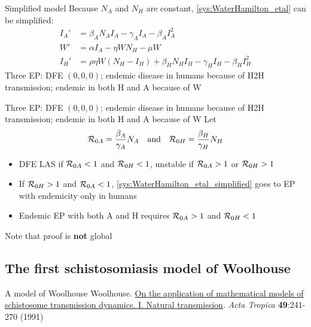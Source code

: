 \documentclass[aspectratio=169]{beamer}
\begin{document}
\begin{frame}{Simplified model}
  Because $N_A$ and $N_H$ are constant, \eqref{sys:WaterHamilton_etal} can be simplified:
  \begin{subequations}
    \label{sys:WaterHamilton_etal_simplified}
    \begin{align}
      I_A' &= \beta_AN_AI_A-\gamma_AI_A-\beta_AI_A^2 \\
      W' &= \alpha I_A-\eta WN_H-\mu W \\
      I_H' &= \rho\eta W(N_H-I_H)+\beta_HN_HI_H-\gamma_HI_H-\beta_HI_H^2 
    \end{align}
  \end{subequations}
  \vfill
  Three EP: DFE $(0,0,0)$; endemic disease in humans because of H2H transmission; endemic in both H and A because of W
\end{frame}


\begin{frame}
  Three EP: DFE $(0,0,0)$; endemic disease in humans because of H2H transmission; endemic in both H and A because of W
  \vfill
  Let
  \begin{equation}
    \mathcal{R}_{0A} = \frac{\beta_A}{\gamma_A}N_A\quad\text{and}\quad
    \mathcal{R}_{0H} = \frac{\beta_H}{\gamma_H}N_H
  \end{equation}
  \vfill
  \begin{itemize}
    \item DFE LAS if $\mathcal{R}_{0A}<1$ and $\mathcal{R}_{0H}<1$, unstable if $\mathcal{R}_{0A}>1$ or $\mathcal{R}_{0H}>1$
    \item If $\mathcal{R}_{0H}>1$ and $\mathcal{R}_{0A}<1$, \eqref{sys:WaterHamilton_etal_simplified} goes to EP with endemicity only in humans
    \item Endemic EP with both A and H requires $\mathcal{R}_{0A}>1$ and $\mathcal{R}_{0H}<1$
  \end{itemize}
  Note that proof is \textbf{not} global
\end{frame}


\subsection{The first schistosomiasis model of Woolhouse}
\begin{frame}{A model of Woolhouse}
  Woolhouse. \href{}{On the application of mathematical models of schistosome transmission dynamics. I. Natural transmission}. \emph{Acta Tropica} \textbf{49}:241-270 (1991)
\end{frame}
\end{document}
